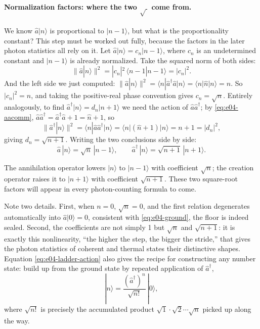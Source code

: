 \paragraph{Normalization factors: where the two \(\sqrt{\ }\) come from.}
We know \(\hat a|n\rangle\) is proportional to \(|n-1\rangle\), but what is the proportionality constant? This step must be worked out fully, because the factors in the later photon statistics all rely on it. Let \(\hat a|n\rangle=c_n|n-1\rangle\), where \(c_n\) is an undetermined constant and \(|n-1\rangle\) is already normalized. Take the squared norm of both sides:
\[
  \big\|\hat a|n\rangle\big\|^2
  =|c_n|^2\,\langle n-1|n-1\rangle
  =|c_n|^2 .
\]
And the left side we just computed: \(\big\|\hat a|n\rangle\big\|^2=\langle n|\hat a^\dagger\hat a|n\rangle=\langle n|\hat n|n\rangle=n\). So \(|c_n|^2=n\), and taking the positive-real phase convention gives \(c_n=\sqrt{n}\). Entirely analogously, to find \(\hat a^\dagger|n\rangle=d_n|n+1\rangle\) we need the action of \(\hat a\hat a^\dagger\); by \eqref{eq:e04-aacomm}, \(\hat a\hat a^\dagger=\hat a^\dagger\hat a+1=\hat n+1\), so
\[
  \big\|\hat a^\dagger|n\rangle\big\|^2
  =\langle n|\hat a\hat a^\dagger|n\rangle
  =\langle n|(\hat n+1)|n\rangle
  =n+1
  =|d_n|^2,
\]
giving \(d_n=\sqrt{n+1}\). Writing the two conclusions side by side:
\begin{equation}
  \hat a\,|n\rangle=\sqrt{n}\,|n-1\rangle,
  \qquad
  \hat a^\dagger\,|n\rangle=\sqrt{n+1}\,|n+1\rangle .
  \label{eq:e04-ladder-action}
\end{equation}
\begin{formulaexplain}
The annihilation operator lowers \(|n\rangle\) to \(|n-1\rangle\) with coefficient \(\sqrt{n}\); the creation operator raises it to \(|n+1\rangle\) with coefficient \(\sqrt{n+1}\). These two square-root factors will appear in every photon-counting formula to come.
\end{formulaexplain}
Note two details. First, when \(n=0\), \(\sqrt{n}=0\), and the first relation degenerates automatically into \(\hat a|0\rangle=0\), consistent with \eqref{eq:e04-ground}, the floor is indeed sealed. Second, the coefficients are not simply 1 but \(\sqrt n\) and \(\sqrt{n+1}\): it is exactly this nonlinearity, ``the higher the step, the bigger the stride,'' that gives the photon statistics of coherent and thermal states their distinctive shapes. Equation \eqref{eq:e04-ladder-action} also gives the recipe for constructing any number state: build up from the ground state by repeated application of \(\hat a^\dagger\),
\[
  |n\rangle=\frac{(\hat a^\dagger)^n}{\sqrt{n!}}\,|0\rangle,
\]
where \(\sqrt{n!}\) is precisely the accumulated product \(\sqrt{1}\cdot\sqrt{2}\cdots\sqrt{n}\) picked up along the way.

